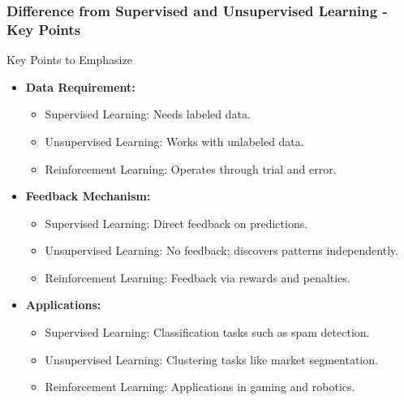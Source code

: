 \documentclass[aspectratio=169]{beamer}
\begin{document}
\begin{frame}[fragile]
    \frametitle{Difference from Supervised and Unsupervised Learning - Key Points}
    \begin{block}{Key Points to Emphasize}
        \begin{itemize}
            \item \textbf{Data Requirement:}
            \begin{itemize}
                \item Supervised Learning: Needs labeled data.
                \item Unsupervised Learning: Works with unlabeled data.
                \item Reinforcement Learning: Operates through trial and error.
            \end{itemize}

            \item \textbf{Feedback Mechanism:}
            \begin{itemize}
                \item Supervised Learning: Direct feedback on predictions.
                \item Unsupervised Learning: No feedback; discovers patterns independently.
                \item Reinforcement Learning: Feedback via rewards and penalties.
            \end{itemize}

            \item \textbf{Applications:}
            \begin{itemize}
                \item Supervised Learning: Classification tasks such as spam detection.
                \item Unsupervised Learning: Clustering tasks like market segmentation.
                \item Reinforcement Learning: Applications in gaming and robotics.
            \end{itemize}
        \end{itemize}
    \end{block}
\end{frame}
\end{document}
